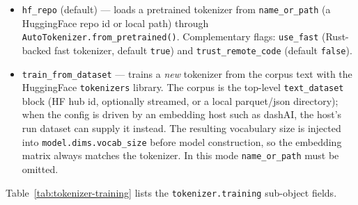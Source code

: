 \begin{itemize}[nosep]
    \item \texttt{hf\_repo} (default) --- loads a pretrained tokenizer from \texttt{name\_or\_path} (a HuggingFace repo id or local path) through \texttt{AutoTokenizer.from\_pretrained()}. Complementary flags: \texttt{use\_fast} (Rust-backed fast tokenizer, default \texttt{true}) and \texttt{trust\_remote\_code} (default \texttt{false}).
    \item \texttt{train\_from\_dataset} --- trains a \emph{new} tokenizer from the corpus text with the HuggingFace \texttt{tokenizers} library. The corpus is the top-level \texttt{text\_dataset} block (HF hub id, optionally streamed, or a local parquet/json directory); when the config is driven by an embedding host such as dashAI, the host's run dataset can supply it instead. The resulting vocabulary size is injected into \texttt{model.dims.vocab\_size} before model construction, so the embedding matrix always matches the tokenizer. In this mode \texttt{name\_or\_path} must be omitted.
\end{itemize}

Table~\ref{tab:tokenizer-training} lists the \texttt{tokenizer.training} sub-object fields.

